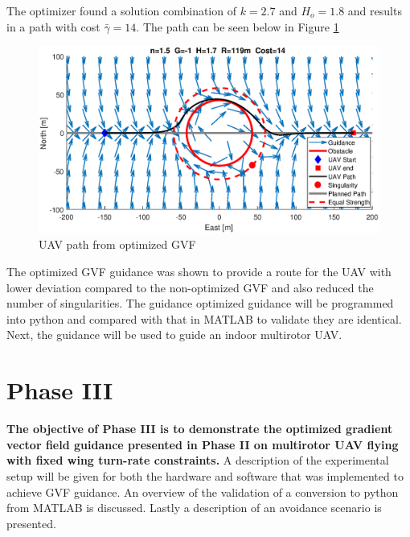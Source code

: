 \documentclass[numbered,pdftex]{ohio-etd}
\begin{document}
The optimizer found a solution combination of $k=2.7$ and $H_o = 1.8$ and results in a path with cost $\bar{\gamma}=14$. The path can be seen below in Figure \ref{fig:optimizedPath}

\begin{figure}[H]
	\centering
	\includegraphics[width=16cm]{PaperFigures/Methods/numericallySolvedPath}
	\caption{UAV path from optimized GVF}
	\label{fig:optimizedPath}
\end{figure}


The optimized GVF guidance was shown to provide a route for the UAV with lower deviation compared to the non-optimized GVF and also reduced the number of singularities. The guidance optimized guidance will be programmed into python and compared with that in MATLAB to validate they are identical. Next, the guidance will be used to guide an indoor multirotor UAV.



\section{Phase III}
\textbf{The objective of Phase III is to demonstrate the optimized gradient vector field guidance presented in Phase II on multirotor UAV flying with fixed wing turn-rate constraints.} A description of the experimental setup will be given for both the hardware and software that was implemented to achieve GVF guidance. An overview of the validation of a conversion to python from MATLAB is discussed. Lastly a description of an avoidance scenario is presented.
\end{document}

